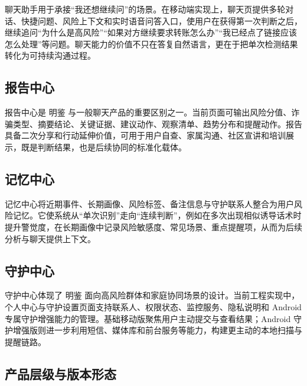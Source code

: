 \documentclass[UTF8,a4paper,12pt]{ctexart}
\begin{document}
聊天助手用于承接“我还想继续问”的场景。在移动端实现上，聊天页提供多轮对话、快捷问题、风险上下文和实时语音问答入口，使用户在获得第一次判断之后，继续追问“为什么是高风险”“如果对方继续要求转账怎么办”“我已经点了链接应该怎么处理”等问题。聊天能力的价值不只在答复自然语言，更在于把单次检测结果转化为可持续沟通过程。

\subsection{报告中心}

报告中心是 明鉴 与一般聊天产品的重要区别之一。当前页面可输出风险分值、诈骗类型、摘要结论、关键证据、建议动作、观察清单、趋势分布和提醒动作。报告具备二次分享和行动延伸价值，可用于用户自查、家属沟通、社区宣讲和培训展示，既是判断结果，也是后续协同的标准化载体。

\subsection{记忆中心}

记忆中心将近期事件、长期画像、风险标签、备注信息与守护联系人整合为用户风险记忆。它使系统从“单次识别”走向“连续判断”，例如在多次出现相似诱导话术时提升警觉度，在长期画像中记录风险敏感度、常见场景、重点提醒项，从而为后续分析与聊天提供上下文。

\subsection{守护中心}

守护中心体现了 明鉴 面向高风险群体和家庭协同场景的设计。当前工程实现中，个人中心与守护设置页面支持联系人、权限状态、监控服务、隐私说明和 Android 专属守护增强能力的管理。基础移动版聚焦用户主动提交与查看结果；Android 守护增强版则进一步利用短信、媒体库和前台服务等能力，构建更主动的本地扫描与提醒链路。

\subsection{产品层级与版本形态}
\end{document}
